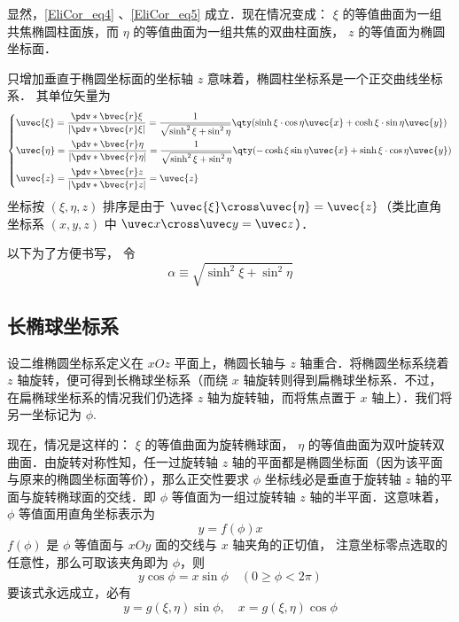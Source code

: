 显然，\autoref{EliCor_eq4} 、\autoref{EliCor_eq5} 成立．现在情况变成： $\xi$ 的等值曲面为一组共焦椭圆柱面族，而 $\eta$ 的等值曲面为一组共焦的双曲柱面族， $z$ 的等值面为椭圆坐标面．

只增加垂直于椭圆坐标面的坐标轴 $z$ 意味着，椭圆柱坐标系是一个正交曲线坐标系． 其单位矢量为
\begin{equation}
\left\{
    \begin{aligned}
    &\uvec{\xi}=\frac{\pdv*{\bvec{r}}{\xi}}{|\pdv*{\bvec{r}}{\xi}|}=\frac{1}{\sqrt{\sinh^2\xi+\sin^2\eta}}\qty(\sinh\xi\cdot\cos\eta\uvec{x}+\cosh\xi\cdot\sin\eta\uvec{y})\\
    &\uvec{\eta }=\frac{\pdv*{\bvec{r}}{\eta}}{|\pdv*{\bvec{r}}{\eta}|}=\frac{1}{\sqrt{\sinh^2\xi+\sin^2\eta}}\qty(-\cosh\xi\sin\eta\uvec{x}+\sinh\xi\cdot\cos\eta\uvec{y})\\
    &\uvec{z}=\frac{\pdv*{\bvec{r}}{z}}{|\pdv*{\bvec{r}}{z}|}=\uvec{z}
    \end{aligned}\right.
\end{equation}
坐标按 $(\xi,\eta,z)$ 排序是由于 $\uvec{\xi}\cross\uvec{\eta}=\uvec{z}$（类比直角坐标系 $(x,y,z)$ 中 $\uvec x\cross\uvec y=\uvec z$）．

以下为了方便书写， 令
\begin{equation}
\alpha \equiv \sqrt{\sinh^2\xi+\sin^2\eta}
\end{equation}

\subsection{长椭球坐标系}
设二维椭圆坐标系定义在 $xOz$ 平面上，椭圆长轴与 $z$ 轴重合．将椭圆坐标系绕着 $z$ 轴旋转，便可得到长椭球坐标系（而绕 $x$ 轴旋转则得到扁椭球坐标系．不过，在扁椭球坐标系的情况我们仍选择 $z$ 轴为旋转轴，而将焦点置于 $x$ 轴上）．我们将另一坐标记为 $\phi$.

现在，情况是这样的： $\xi$ 的等值曲面为旋转椭球面， $\eta$ 的等值曲面为双叶旋转双曲面．由旋转对称性知，任一过旋转轴 $z$ 轴的平面都是椭圆坐标面（因为该平面与原来的椭圆坐标面等价），那么正交性要求 $\phi$ 坐标线必是垂直于旋转轴 $z$ 轴的平面与旋转椭球面的交线．即 $\phi$ 等值面为一组过旋转轴 $z$ 轴的半平面．这意味着， $\phi$ 等值面用直角坐标表示为
\begin{equation}
y=f(\phi)x
\end{equation}
$f(\phi)$ 是 $\phi$ 等值面与 $xOy$ 面的交线与 $x$ 轴夹角的正切值， 注意坐标零点选取的任意性，那么可取该夹角即为 $\phi$，则
\begin{equation}
y\cos\phi = x\sin\phi\quad(0\geq\phi<2\pi)
\end{equation}
要该式永远成立，必有
\begin{equation}\label{EliCor_eq2}
y = g(\xi,\eta)\sin\phi,\quad
x = g(\xi,\eta)\cos\phi
\end{equation}

